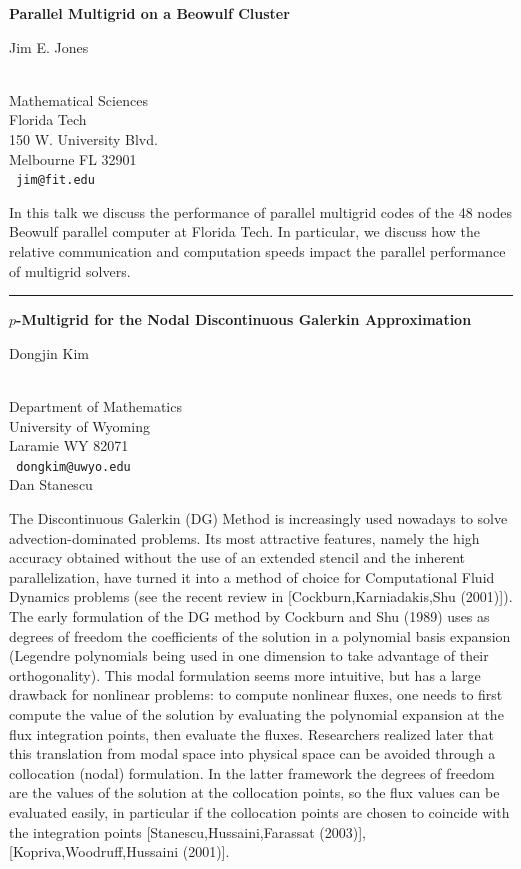 \documentclass[twosided]{report}
\begin{document}
\begin{center}
{\large			\label{jones}
{\bf
Parallel Multigrid on a Beowulf Cluster
}

Jim E. Jones} \\
Mathematical Sciences \\
Florida Tech \\
150 W. University Blvd. \\
Melbourne FL 32901
\\ {\tt
jim@fit.edu
}

\end{center}

In this talk we discuss the performance of parallel multigrid codes of
the 48 nodes Beowulf parallel computer at Florida Tech. In particular,
we discuss how the relative communication and computation speeds impact
the parallel performance of multigrid solvers.



\begin{center} \rule{6in}{1pt} \end{center}


\begin{center}
{\large			\label{kimd}
{\bf $p$-Multigrid for the Nodal Discontinuous Galerkin Approximation}

Dongjin Kim} \\
Department of Mathematics \\
University of Wyoming \\
Laramie WY 82071
\\ {\tt
dongkim@uwyo.edu
}
\\
Dan Stanescu
\end{center}



The Discontinuous Galerkin (DG) Method is increasingly used nowadays to
solve advection-dominated problems. Its most attractive features,
namely the high accuracy obtained without the use of an extended
stencil and the inherent parallelization, have turned it into a method
of choice for Computational Fluid Dynamics problems (see the recent
review in [Cockburn,Karniadakis,Shu (2001)]). The early formulation of
the DG method by Cockburn and Shu (1989) uses as degrees of freedom the
coefficients of the solution in a polynomial basis expansion (Legendre
polynomials being used in one dimension to take advantage of their
orthogonality). This modal formulation seems more intuitive, but has a
large drawback for nonlinear problems: to compute nonlinear fluxes, one
needs to first compute the value of the solution by evaluating the
polynomial expansion at the flux integration points, then evaluate the
fluxes. Researchers realized later that this translation from modal
space into physical space can be avoided through a collocation (nodal)
formulation. In the latter framework the degrees of freedom are the
values of the solution at the collocation points, so the flux values
can be evaluated easily, in particular if the collocation points are
chosen to coincide with the integration points
[Stanescu,Hussaini,Farassat (2003)], [Kopriva,Woodruff,Hussaini
(2001)].
\end{document}
